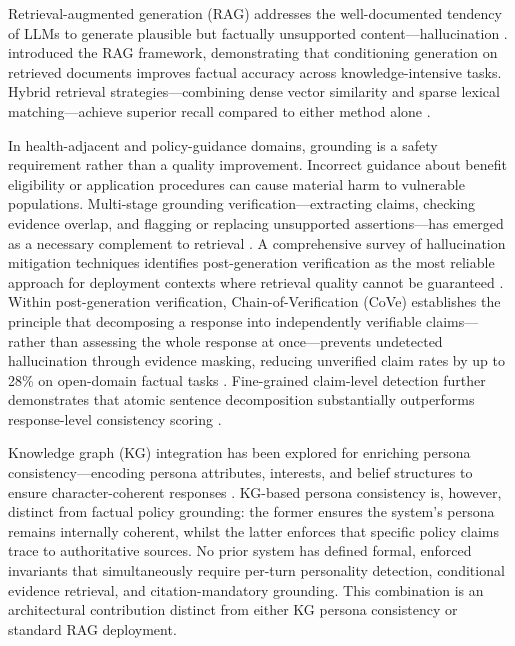 \documentclass[10pt,a4paper]{report}
\begin{document}
Retrieval-augmented generation (RAG) addresses the well-documented tendency of LLMs to generate plausible but factually unsupported content---hallucination \citep{Ji2023}. \citet{Lewis2020} introduced the RAG framework, demonstrating that conditioning generation on retrieved documents improves factual accuracy across knowledge-intensive tasks. Hybrid retrieval strategies---combining dense vector similarity and sparse lexical matching---achieve superior recall compared to either method alone \citep{Karpukhin2020, Ma2023}.

In health-adjacent and policy-guidance domains, grounding is a safety requirement rather than a quality improvement. Incorrect guidance about benefit eligibility or application procedures can cause material harm to vulnerable populations. Multi-stage grounding verification---extracting claims, checking evidence overlap, and flagging or replacing unsupported assertions---has emerged as a necessary complement to retrieval \citep{Thoppilan2022, Gao2023, Singhal2023}. A comprehensive survey of hallucination mitigation techniques identifies post-generation verification as the most reliable approach for deployment contexts where retrieval quality cannot be guaranteed \citep{Tonmoy2024}. Within post-generation verification, Chain-of-Verification (CoVe) establishes the principle that decomposing a response into independently verifiable claims---rather than assessing the whole response at once---prevents undetected hallucination through evidence masking, reducing unverified claim rates by up to 28\% on open-domain factual tasks \citep{Dhuliawala2023}. Fine-grained claim-level detection further demonstrates that atomic sentence decomposition substantially outperforms response-level consistency scoring \citep{Mishra2024}.

Knowledge graph (KG) integration has been explored for enriching persona consistency---encoding persona attributes, interests, and belief structures to ensure character-coherent responses \citep{Majumder2020, Luan2017}. KG-based persona consistency is, however, distinct from factual policy grounding: the former ensures the system's persona remains internally coherent, whilst the latter enforces that specific policy claims trace to authoritative sources. No prior system has defined formal, enforced invariants that simultaneously require per-turn personality detection, conditional evidence retrieval, and citation-mandatory grounding. This combination is an architectural contribution distinct from either KG persona consistency or standard RAG deployment.
\end{document}
